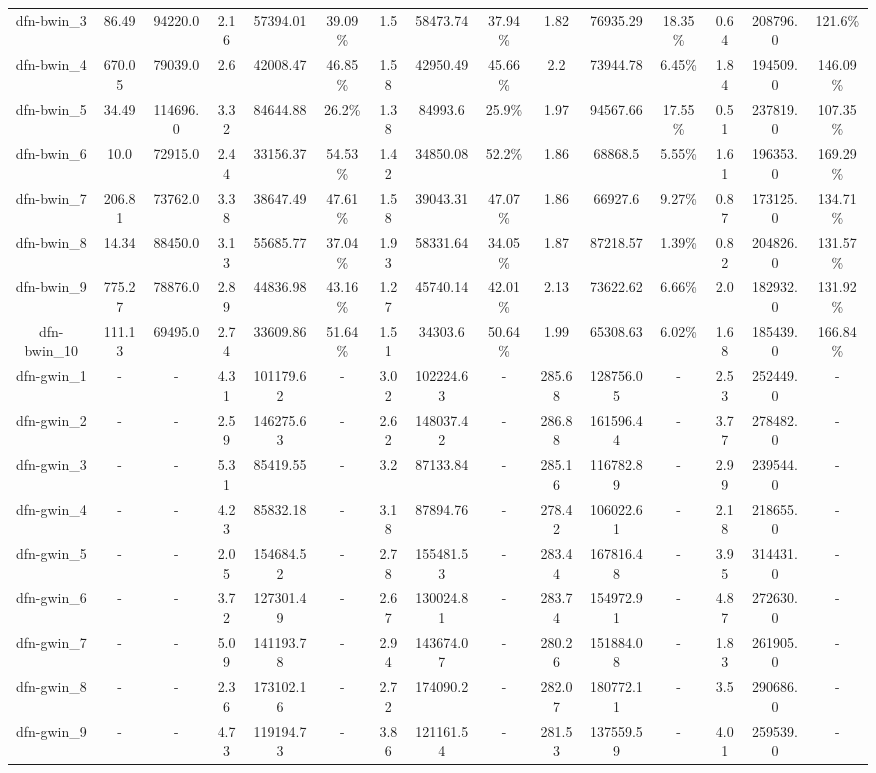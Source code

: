 \documentclass[main.tex]{subfiles}
\begin{document}
\begin{landscape}
\begin{table}[h]
\begin{tabular}{c|cc|ccc|ccc|ccc|ccc}
	dfn-bwin\_3 &86.49 &94220.0 &2.16 &57394.01 &39.09\% &1.5 &58473.74 &37.94\% &1.82 &76935.29 &18.35\% &0.64 &208796.0 &121.6\%\\
	dfn-bwin\_4 &670.05 &79039.0 &2.6 &42008.47 &46.85\% &1.58 &42950.49 &45.66\% &2.2 &73944.78 &6.45\% &1.84 &194509.0 &146.09\%\\
	dfn-bwin\_5 &34.49 &114696.0 &3.32 &84644.88 &26.2\% &1.38 &84993.6 &25.9\% &1.97 &94567.66 &17.55\% &0.51 &237819.0 &107.35\%\\
	dfn-bwin\_6 &10.0 &72915.0 &2.44 &33156.37 &54.53\% &1.42 &34850.08 &52.2\% &1.86 &68868.5 &5.55\% &1.61 &196353.0 &169.29\%\\
	dfn-bwin\_7 &206.81 &73762.0 &3.38 &38647.49 &47.61\% &1.58 &39043.31 &47.07\% &1.86 &66927.6 &9.27\% &0.87 &173125.0 &134.71\%\\
	dfn-bwin\_8 &14.34 &88450.0 &3.13 &55685.77 &37.04\% &1.93 &58331.64 &34.05\% &1.87 &87218.57 &1.39\% &0.82 &204826.0 &131.57\%\\
	dfn-bwin\_9 &775.27 &78876.0 &2.89 &44836.98 &43.16\% &1.27 &45740.14 &42.01\% &2.13 &73622.62 &6.66\% &2.0 &182932.0 &131.92\%\\
	dfn-bwin\_10 &111.13 &69495.0 &2.74 &33609.86 &51.64\% &1.51 &34303.6 &50.64\% &1.99 &65308.63 &6.02\% &1.68 &185439.0 &166.84\%\\
	dfn-gwin\_1 &- &- &4.31 &101179.62 &- &3.02 &102224.63 &- &285.68 &128756.05 &- &2.53 &252449.0 &-\\
	dfn-gwin\_2 &- &- &2.59 &146275.63 &- &2.62 &148037.42 &- &286.88 &161596.44 &- &3.77 &278482.0 &-\\
	dfn-gwin\_3 &- &- &5.31 &85419.55 &- &3.2 &87133.84 &- &285.16 &116782.89 &- &2.99 &239544.0 &-\\
	dfn-gwin\_4 &- &- &4.23 &85832.18 &- &3.18 &87894.76 &- &278.42 &106022.61 &- &2.18 &218655.0 &-\\
	dfn-gwin\_5 &- &- &2.05 &154684.52 &- &2.78 &155481.53 &- &283.44 &167816.48 &- &3.95 &314431.0 &-\\
	dfn-gwin\_6 &- &- &3.72 &127301.49 &- &2.67 &130024.81 &- &283.74 &154972.91 &- &4.87 &272630.0 &-\\
	dfn-gwin\_7 &- &- &5.09 &141193.78 &- &2.94 &143674.07 &- &280.26 &151884.08 &- &1.83 &261905.0 &-\\
	dfn-gwin\_8 &- &- &2.36 &173102.16 &- &2.72 &174090.2 &- &282.07 &180772.11 &- &3.5 &290686.0 &-\\
	dfn-gwin\_9 &- &- &4.73 &119194.73 &- &3.86 &121161.54 &- &281.53 &137559.59 &- &4.01 &259539.0 &-\\

\end{tabular}
\end{table}
\end{landscape}
\end{document}
